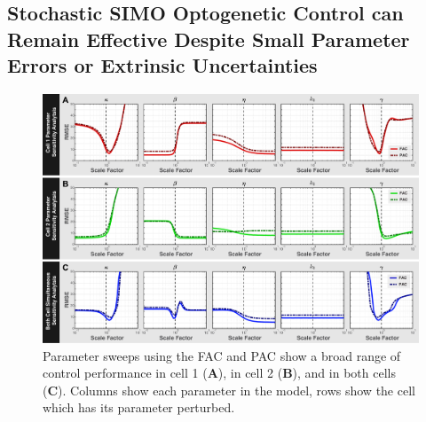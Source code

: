 \documentclass[12pt]{iopart}
\begin{document}
\subsection{Stochastic SIMO Optogenetic Control can Remain Effective Despite Small Parameter Errors or Extrinsic Uncertainties}
\begin{figure}
\begin{center}
\includegraphics[width=1\textwidth]{ParameterPerturbation.pdf}
\caption{Parameter sweeps using the FAC and PAC show a broad range of control performance in cell 1 ({\bf A}),  in cell 2 ({\bf B}), and in both cells ({\bf C}). Columns show each parameter in the model, rows show the cell which has its parameter perturbed. }
\label{Parameter}
\end{center}
\end{figure}
\end{document}
